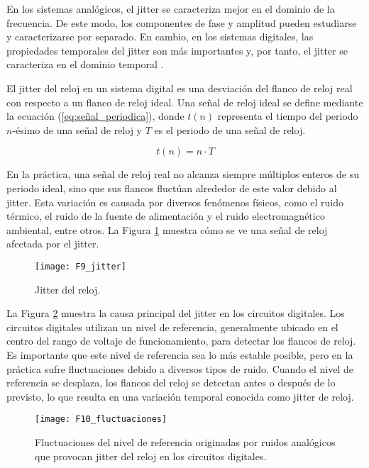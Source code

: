             En los sistemas analógicos, el jitter se caracteriza mejor en el dominio de la frecuencia. De este modo, los componentes de fase y amplitud pueden estudiarse y caracterizarse por separado. En cambio, en los sistemas digitales, las propiedades temporales del jitter son más importantes y, por tanto, el jitter se caracteriza en el dominio temporal \cite{Fischer2003}.

            El jitter del reloj en un sistema digital es una desviación del flanco de reloj real con respecto a un flanco de reloj ideal. Una señal de reloj ideal se define mediante la ecuación (\ref{eq:señal_periodica}), donde $t(n)$ representa el tiempo del periodo $n$-ésimo de una señal de reloj y $T$ es el periodo de una señal de reloj.

            \begin{equation}
                t(n) = n \cdot T 
                \label{eq:señal_periodica}
            \end{equation}

            En la práctica, una señal de reloj real no alcanza siempre múltiplos enteros de su periodo ideal, sino que sus flancos fluctúan alrededor de este valor debido al jitter. Esta variación es causada por diversos fenómenos físicos, como el ruido térmico, el ruido de la fuente de alimentación y el ruido electromagnético ambiental, entre otros. La Figura \ref{fig:F9_jitter} muestra cómo se ve una señal de reloj afectada por el jitter.

            \begin{figure}[hbtp]
                \centering
                \texttt{[image: F9\_jitter]}
                \caption{Jitter del reloj.}
                \label{fig:F9_jitter}
            \end{figure}
                
            La Figura \ref{fig:F10_fluctuaciones} muestra la causa principal del jitter en los circuitos digitales. Los circuitos digitales utilizan un nivel de referencia, generalmente ubicado en el centro del rango de voltaje de funcionamiento, para detectar los flancos de reloj. Es importante que este nivel de referencia sea lo más estable posible, pero en la práctica sufre fluctuaciones debido a diversos tipos de ruido. Cuando el nivel de referencia se desplaza, los flancos del reloj se detectan antes o después de lo previsto, lo que resulta en una variación temporal conocida como jitter de reloj.

            \begin{figure}[hbtp]
                \centering
                \texttt{[image: F10\_fluctuaciones]}
                \caption{Fluctuaciones del nivel de referencia originadas por ruidos analógicos que provocan jitter del reloj en los circuitos digitales. \cite{Petura2019}}
                \label{fig:F10_fluctuaciones}
            \end{figure}
        
